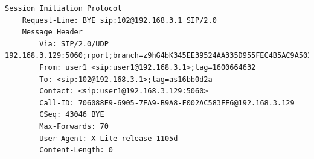 \documentclass[12pt,a4paper,notitlepage]{article}
\begin{document}
\begin{lstlisting}[title=Contenu d'un paquet BYE]
Session Initiation Protocol
    Request-Line: BYE sip:102@192.168.3.1 SIP/2.0
    Message Header
        Via: SIP/2.0/UDP 192.168.3.129:5060;rport;branch=z9hG4bK345EE39524AA335D955FEC4B5AC9A503
        From: user1 <sip:user1@192.168.3.1>;tag=1600664632
        To: <sip:102@192.168.3.1>;tag=as16bb0d2a
        Contact: <sip:user1@192.168.3.129:5060>
        Call-ID: 706088E9-6905-7FA9-B9A8-F002AC583FF6@192.168.3.129
        CSeq: 43046 BYE
        Max-Forwards: 70
        User-Agent: X-Lite release 1105d
        Content-Length: 0
\end{lstlisting}
\end{document}
